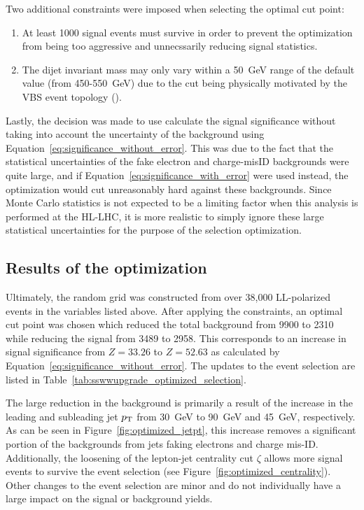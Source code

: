 Two additional constraints were imposed when selecting the optimal cut point:
\begin{enumerate}
\item At least 1000 signal events must survive in order to prevent the optimization from being too aggressive and unnecssarily reducing signal statistics.
\item The dijet invariant mass may only vary within a 50~GeV range of the default value (from 450-550~GeV) due to the cut being physically motivated by the VBS event topology ().
\end{enumerate}

Lastly, the decision was made to use calculate the signal significance without taking into account the uncertainty of the background using Equation~\ref{eq:significance_without_error}.
This was due to the fact that the statistical uncertainties of the fake electron and charge-misID backgrounds were quite large, and if Equation~\ref{eq:significance_with_error} were used instead, the optimization would cut unreasonably hard against these backgrounds.
Since Monte Carlo statistics is not expected to be a limiting factor when this analysis is performed at the HL-LHC, it is more realistic to simply ignore these large statistical uncertainties for the purpose of the selection optimization.

%
\subsection{Results of the optimization}\label{sswwupgrade:opt_results}
Ultimately, the random grid was constructed from over 38,000 LL-polarized \ssww events in the variables listed above.
After applying the constraints, an optimal cut point was chosen which reduced the total background from 9900 to 2310 while reducing the signal from 3489 to 2958.
This corresponds to an increase in signal significance from $Z = 33.26$ to $Z = 52.63$ as calculated by Equation~\ref{eq:significance_without_error}.
The updates to the event selection are listed in Table~\ref{tab:sswwupgrade_optimized_selection}. %

The large reduction in the background is primarily a result of the increase in the leading and subleading jet $p_{\mathrm{T}}$ from 30~GeV to 90~GeV and 45~GeV, respectively.
As can be seen in Figure~\ref{fig:optimized_jetpt}, this increase removes a significant portion of the backgrounds from jets faking electrons and charge mis-ID.
Additionally, the loosening of the lepton-jet centrality cut $\zeta$ allows more signal events to survive the event selection (see Figure~\ref{fig:optimized_centrality}).
Other changes to the event selection are minor and do not individually have a large impact on the signal or background yields.

